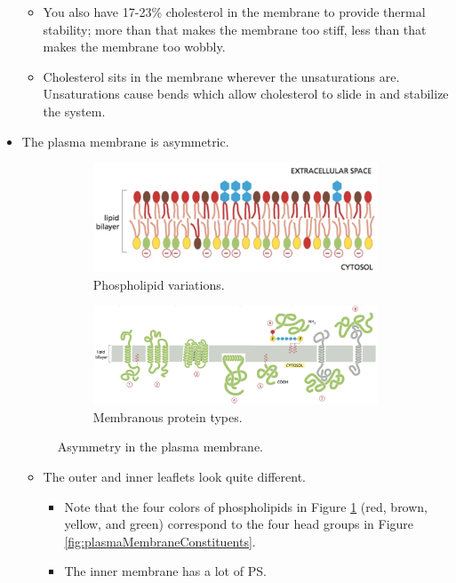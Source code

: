 \documentclass[../notes.tex]{subfiles}
\begin{document}
\begin{itemize}
\begin{itemize}
        \item You also have 17-23\% cholesterol in the membrane to provide thermal stability; more than that makes the membrane too stiff, less than that makes the membrane too wobbly.
        \item Cholesterol sits in the membrane wherever the unsaturations are. Unsaturations cause bends which allow cholesterol to slide in and stabilize the system.
    \end{itemize}
    \item The plasma membrane is asymmetric.
    \begin{figure}[h!]
        \centering
        \begin{subfigure}[b]{\linewidth}
            \centering
            \includegraphics[width=0.4\linewidth]{../ExtFiles/plasmaMembraneAsyma.png}
            \caption{Phospholipid variations.}
            \label{fig:plasmaMembraneAsyma}
        \end{subfigure}
        \begin{subfigure}[b]{\linewidth}
            \centering
            \includegraphics[width=0.7\linewidth]{../ExtFiles/plasmaMembraneAsymb.png}
            \caption{Membranous protein types.}
            \label{fig:plasmaMembraneAsymb}
        \end{subfigure}
        \caption{Asymmetry in the plasma membrane.}
        \label{fig:plasmaMembraneAsym}
    \end{figure}
    \begin{itemize}
        \item The outer and inner leaflets look quite different.
        \begin{itemize}
            \item Note that the four colors of phospholipids in Figure \ref{fig:plasmaMembraneAsyma} (red, brown, yellow, and green) correspond to the four head groups in Figure \ref{fig:plasmaMembraneConstituents}.
            \item The inner membrane has a lot of PS.

\end{itemize}
\end{itemize}
\end{itemize}
\end{document}
